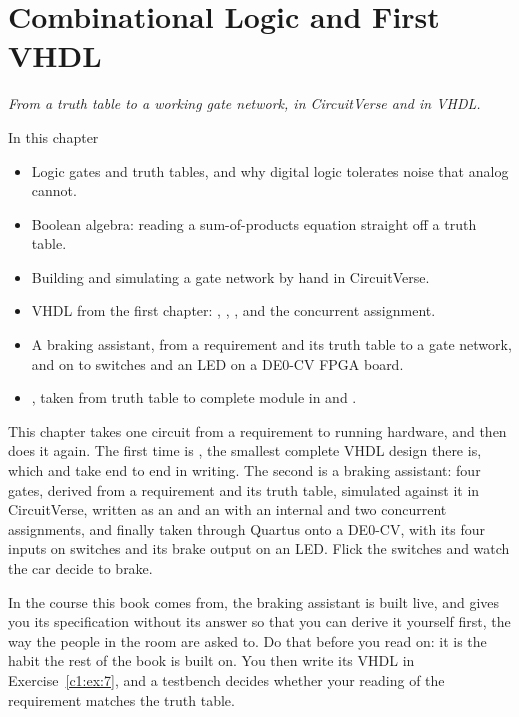 
\chapter{Combinational Logic and First VHDL}
\label{c1:ch}

{\large\itshape From a truth table to a working gate network, in CircuitVerse and in VHDL.\par}

\begin{chapterbox}{In this chapter}
\begin{itemize}
  \item Logic gates and truth tables, and why digital logic tolerates noise that analog cannot.
  \item Boolean algebra: reading a sum-of-products equation straight off a truth table.
  \item Building and simulating a gate network by hand in CircuitVerse.
  \item VHDL from the first chapter: , , , and the
    concurrent assignment.
  \item A braking assistant, from a requirement and its truth table to a gate network, and on to
    switches and an LED on a DE0-CV FPGA board.
  \item {}, taken from truth table to complete module in  and
    .
\end{itemize}
\end{chapterbox}

This chapter takes one circuit from a requirement to running hardware, and then does it again. The
first time is , the smallest complete VHDL design there is, which  and
 take end to end in writing. The second is a braking assistant: four gates, derived
from a requirement and its truth table, simulated against it in CircuitVerse, written as an
 and an  with an internal  and two concurrent
assignments, and finally taken through Quartus onto a DE0-CV, with its four inputs on switches and
its brake output on an LED. Flick the switches and watch the car decide to brake.

In the course this book comes from, the braking assistant is built live, and  gives
you its specification without its answer so that you can derive it yourself first, the way the
people in the room are asked to. Do that before you read on: it is the habit the rest of the book
is built on. You then write its VHDL in Exercise~\ref{c1:ex:7}, and a testbench decides whether your
reading of the requirement matches the truth table.


